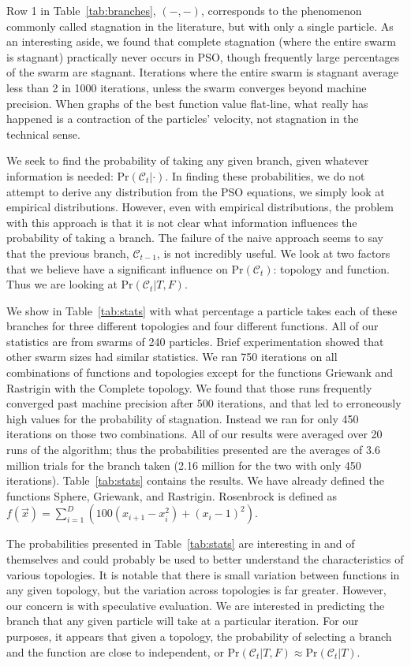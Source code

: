 \documentclass[journal,letterpaper]{IEEEtran}
\providecommand{\caseset}{\ensuremath{\mathcal{C}}}
\providecommand{\casepn}{\ensuremath{(-,-)}}
\providecommand{\prob}{\ensuremath{\mathrm{Pr}}}
\begin{document}
Row 1 in Table~\ref{tab:branches}, \casepn, corresponds to the phenomenon
commonly called stagnation in the literature, but with only a single particle.
As an interesting aside, we found that complete stagnation (where the entire
swarm is stagnant) practically never occurs in PSO, though frequently large
percentages of the swarm are stagnant.  Iterations where the entire swarm is
stagnant average less than 2 in 1000 iterations, unless the swarm converges
beyond machine precision.  When graphs of the best function value flat-line,
what really has happened is a contraction of the particles' velocity, not
stagnation in the technical sense.  

We seek to find the probability of taking any given branch, given whatever
information is needed: $\prob(\caseset_t|\cdot)$.  In finding these
probabilities, we do not attempt to derive any distribution from the PSO
equations, we simply look at empirical distributions.  However, even with
empirical distributions, the problem with this approach is that it is not clear
what information influences the probability of taking a branch.  The failure of
the naive approach seems to say that the previous branch, $\caseset_{t-1}$, is
not incredibly useful.  We look at two factors that we believe have a
significant influence on $\prob(\caseset_t)$: topology and function.  Thus we
are looking at $\prob(\caseset_t|T,F)$.

We show in Table~\ref{tab:stats} with what percentage a particle takes each of
these branches for three different topologies and four different functions.
All of our statistics are from swarms of 240 particles.  Brief experimentation
showed that other swarm sizes had similar statistics.  We ran 750 iterations on
all combinations of functions and topologies except for the functions Griewank
and Rastrigin with the Complete topology.  We found that those runs frequently
converged past machine precision after 500 iterations, and that led to
erroneously high values for the probability of stagnation.  Instead we ran for
only 450 iterations on those two combinations.  All of our results were
averaged over 20 runs of the algorithm; thus the probabilities presented are
the averages of 3.6 million trials for the branch taken (2.16 million for the
two with only 450 iterations).  Table~\ref{tab:stats} contains the results.  We
have already defined the functions Sphere, Griewank, and Rastrigin.  Rosenbrock
is defined as $f(\Vec{x}) = \sum_{i=1}^D
\left(100(x_{i+1}-x_i^2)+(x_i-1)^2\right)$.

The probabilities presented in Table~\ref{tab:stats} are interesting in and of
themselves and could probably be used to better understand the characteristics
of various topologies.  It is notable that there is small variation between
functions in any given topology, but the variation across topologies is far
greater.  However, our concern is with speculative evaluation.  We are
interested in predicting the branch that any given particle will take at a
particular iteration.  For our purposes, it appears that given a topology, the
probability of selecting a branch and the function are close to independent, or
$\prob(\caseset_t|T,F) \approx \prob(\caseset_t|T)$.
\end{document}
